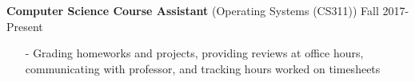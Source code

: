 \documentclass[10pt]{article}
\begin{document}
    \indent\small{\textbf{Computer Science Course Assistant} (Operating Systems (CS311))} \hfill \small{Fall 2017-Present}\indent\vspace{0.5mm}\\
        \indent\begin{minipage}{\dimexpr\textwidth-6cm}
            \begin{itemize}[noitemsep, topsep=0pt]
                \item[-] Grading homeworks and projects, providing reviews at office hours, communicating with professor, and tracking hours worked on timesheets
            \end{itemize}\vspace{0mm}
        \end{minipage}
\end{document}
